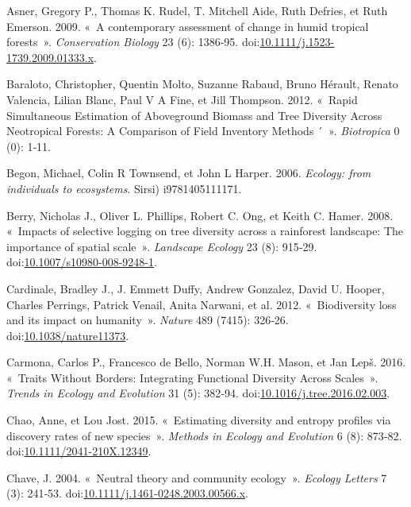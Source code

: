 \documentclass[11pt,french,A4paper,extrafontsizes,onecolumn,openright]{memoir}
\begin{document}
\hypertarget{ref-Asner2009}{}
Asner, Gregory P., Thomas K. Rudel, T. Mitchell Aide, Ruth Defries, et
Ruth Emerson. 2009. «~A contemporary assessment of change in humid
tropical forests~». \emph{Conservation Biology} 23 (6): 1386‑95.
doi:\href{https://doi.org/10.1111/j.1523-1739.2009.01333.x}{10.1111/j.1523-1739.2009.01333.x}.

\hypertarget{ref-Baraloto2012}{}
Baraloto, Christopher, Quentin Molto, Suzanne Rabaud, Bruno Hérault,
Renato Valencia, Lilian Blanc, Paul V A Fine, et Jill Thompson. 2012.
«~Rapid Simultaneous Estimation of Aboveground Biomass and Tree
Diversity Across Neotropical Forests: A Comparison of Field Inventory
Methods ´~». \emph{Biotropica} 0 (0): 1‑11.

\hypertarget{ref-Begon2006}{}
Begon, Michael, Colin R Townsend, et John L Harper. 2006. \emph{Ecology:
from individuals to ecosystems}. Sirsi) i9781405111171.

\hypertarget{ref-Berry2008a}{}
Berry, Nicholas J., Oliver L. Phillips, Robert C. Ong, et Keith C.
Hamer. 2008. «~Impacts of selective logging on tree diversity across a
rainforest landscape: The importance of spatial scale~». \emph{Landscape
Ecology} 23 (8): 915‑29.
doi:\href{https://doi.org/10.1007/s10980-008-9248-1}{10.1007/s10980-008-9248-1}.

\hypertarget{ref-Cardinale2012}{}
Cardinale, Bradley J., J. Emmett Duffy, Andrew Gonzalez, David U.
Hooper, Charles Perrings, Patrick Venail, Anita Narwani, et al. 2012.
«~Biodiversity loss and its impact on humanity~». \emph{Nature} 489
(7415): 326‑26.
doi:\href{https://doi.org/10.1038/nature11373}{10.1038/nature11373}.

\hypertarget{ref-Carmona2016}{}
Carmona, Carlos P., Francesco de Bello, Norman W.H. Mason, et Jan Lepš.
2016. «~Traits Without Borders: Integrating Functional Diversity Across
Scales~». \emph{Trends in Ecology and Evolution} 31 (5): 382‑94.
doi:\href{https://doi.org/10.1016/j.tree.2016.02.003}{10.1016/j.tree.2016.02.003}.

\hypertarget{ref-Chao2015}{}
Chao, Anne, et Lou Jost. 2015. «~Estimating diversity and entropy
profiles via discovery rates of new species~». \emph{Methods in Ecology
and Evolution} 6 (8): 873‑82.
doi:\href{https://doi.org/10.1111/2041-210X.12349}{10.1111/2041-210X.12349}.

\hypertarget{ref-Chave2004}{}
Chave, J. 2004. «~Neutral theory and community ecology~». \emph{Ecology
Letters} 7 (3): 241‑53.
doi:\href{https://doi.org/10.1111/j.1461-0248.2003.00566.x}{10.1111/j.1461-0248.2003.00566.x}.
\end{document}
